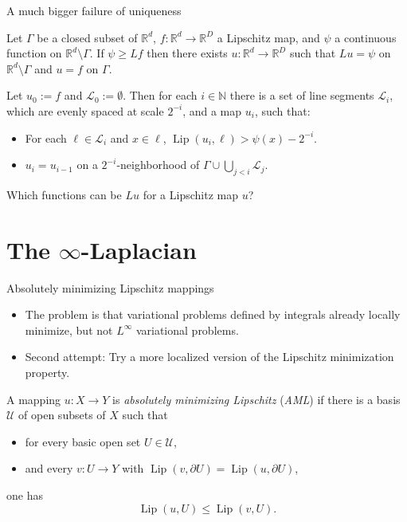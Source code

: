 \documentclass[10pt]{beamer}
\newcommand{\NN}{\mathbb{N}}
\newcommand{\RR}{\mathbb{R}}
\DeclareMathOperator{\Lip}{Lip}
\begin{document}
\begin{frame}{A much bigger failure of uniqueness}

\begin{theorem}
Let $\Gamma$ be a closed subset of $\RR^d$, $f: \RR^d \to \RR^D$ a Lipschitz map, and $\psi$ a continuous function on $\RR^d \setminus \Gamma$.
If $\psi \geq Lf$ then there exists $u: \RR^d \to \RR^D$ such that $Lu = \psi$ on $\RR^d \setminus \Gamma$ and $u = f$ on $\Gamma$. \pause
\end{theorem}

\begin{lemma}
Let $u_0 := f$ and $\mathscr L_0 := \emptyset$.
Then for each $i \in \NN$ there is a set of line segments $\mathscr L_i$, which are evenly spaced at scale $2^{-i}$, and a map $u_i$, such that: \pause
\begin{itemize}
\item For each $\ell \in \mathscr L_i$ and $x \in \ell$, $\Lip(u_i, \ell) > \psi(x) - 2^{-i}$.
\item $u_i = u_{i - 1}$ on a $2^{-i}$-neighborhood of $\Gamma \cup \bigcup_{j < i} \mathscr L_j$. \pause
\end{itemize}
\end{lemma}

\begin{problem}
Which functions can be $Lu$ for a Lipschitz map $u$?
\end{problem}
    
\end{frame}

\section{The \texorpdfstring{$\infty$-Laplacian}{infinity-Laplacian}}

\begin{frame}{Absolutely minimizing Lipschitz mappings}
\begin{itemize}
\item The problem is that variational problems defined by integrals already locally minimize, but not $L^\infty$ variational problems. \pause
\item Second attempt: Try a more localized version of the Lipschitz minimization property. \pause
\end{itemize}

\begin{definition}
A mapping $u: X \to Y$ is \emph{absolutely minimizing Lipschitz} (\emph{AML}) if there is a basis $\mathscr U$ of open subsets of $X$ such that \pause
\begin{itemize}
\item for every basic open set $U \in \mathscr U$,
\item and every $v: U \to Y$ with $\Lip(v, \partial U) = \Lip(u, \partial U)$, \pause
\end{itemize}
one has
$$\Lip(u, U) \leq \Lip(v, U).$$
\end{definition}
\end{frame}
\end{document}
